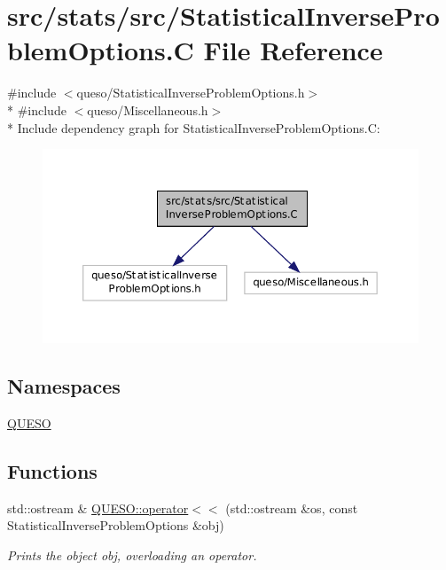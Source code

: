 \hypertarget{_statistical_inverse_problem_options_8_c}{\section{src/stats/src/\-Statistical\-Inverse\-Problem\-Options.C File Reference}
\label{_statistical_inverse_problem_options_8_c}
}
{\ttfamily \#include $<$queso/\-Statistical\-Inverse\-Problem\-Options.\-h$>$}\\*
{\ttfamily \#include $<$queso/\-Miscellaneous.\-h$>$}\\*
Include dependency graph for Statistical\-Inverse\-Problem\-Options.\-C\-:
\nopagebreak
\begin{figure}[H]
\begin{center}
\leavevmode
\includegraphics[width=350pt]{_statistical_inverse_problem_options_8_c__incl}
\end{center}
\end{figure}
\subsection*{Namespaces}
\begin{DoxyCompactItemize}
\item 
\hyperlink{namespace_q_u_e_s_o}{Q\-U\-E\-S\-O}
\end{DoxyCompactItemize}
\subsection*{Functions}
\begin{DoxyCompactItemize}
\item 
std\-::ostream \& \hyperlink{namespace_q_u_e_s_o_a408c51750e38ef3c04031a801f572e8b}{Q\-U\-E\-S\-O\-::operator$<$$<$} (std\-::ostream \&os, const Statistical\-Inverse\-Problem\-Options \&obj)
\begin{DoxyCompactList}\small\item\em Prints the object {\ttfamily obj}, overloading an operator. \end{DoxyCompactList}\end{DoxyCompactItemize}
